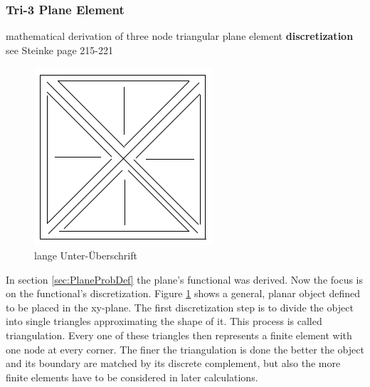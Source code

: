   \subsubsection{Tri-3 Plane Element}
  mathematical derivation of three node triangular plane element \textbf{discretization}\\
  see Steinke \cite{steinke2005finite} page 215-221\\
  \begin{figure}
  	\centering
  	\includegraphics[width=0.7\linewidth]{figures/platzhalter}
  	\caption[kurze Unter-Überschrift]{lange Unter-Überschrift}
  	\label{fig:platzhalter}
  \end{figure}
  In section \ref{sec:PlaneProbDef} the plane's functional was derived. Now the focus is on the functional's discretization. Figure \ref{fig:platzhalter} shows a general, planar object defined to be placed in the xy-plane. The first discretization step is to divide the object into single triangles approximating the shape of it. This process is called triangulation. Every one of these triangles then represents a finite element with one node at every corner. The finer the triangulation is done the better the object and its boundary are matched by its discrete complement, but also the more finite elements have to be considered in later calculations.
